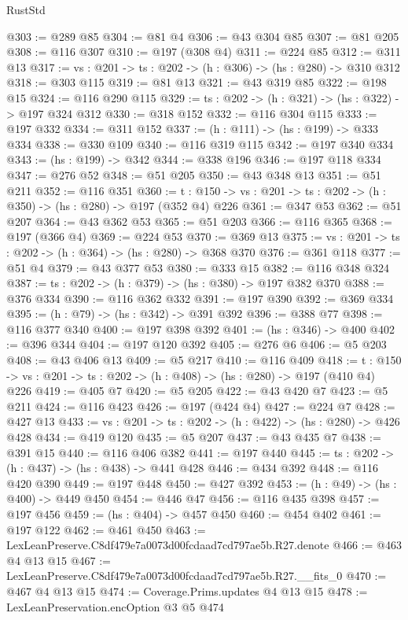 \begin{lexlean}{RustStd}
\begin{coremodule}
@303 := @289 @85
@304 := @81 @4
@306 := @43 @304 @85
@307 := @81 @205
@308 := @116 @307
@310 := @197 (@308 @4)
@311 := @224 @85
@312 := @311 @13
@317 := {vs : @201} -> {ts : @202} -> (h : @306) -> (hs : @280) -> @310 @312
@318 := @303 @115
@319 := @81 @13
@321 := @43 @319 @85
@322 := @198 @15
@324 := @116 @290 @115
@329 := {ts : @202} -> (h : @321) -> (hs : @322) -> @197 @324 @312
@330 := @318 @152
@332 := @116 @304 @115
@333 := @197 @332
@334 := @311 @152
@337 := (h : @111) -> (hs : @199) -> @333 @334
@338 := @330 @109
@340 := @116 @319 @115
@342 := @197 @340 @334
@343 := (hs : @199) -> @342
@344 := @338 @196
@346 := @197 @118 @334
@347 := @276 @52
@348 := @51 @205
@350 := @43 @348 @13
@351 := @51 @211
@352 := @116 @351
@360 := {t : @150} -> {vs : @201} -> {ts : @202} -> (h : @350) -> (hs : @280) -> @197 (@352 @4) @226
@361 := @347 @53
@362 := @51 @207
@364 := @43 @362 @53
@365 := @51 @203
@366 := @116 @365
@368 := @197 (@366 @4)
@369 := @224 @53
@370 := @369 @13
@375 := {vs : @201} -> {ts : @202} -> (h : @364) -> (hs : @280) -> @368 @370
@376 := @361 @118
@377 := @51 @4
@379 := @43 @377 @53
@380 := @333 @15
@382 := @116 @348 @324
@387 := {ts : @202} -> (h : @379) -> (hs : @380) -> @197 @382 @370
@388 := @376 @334
@390 := @116 @362 @332
@391 := @197 @390
@392 := @369 @334
@395 := (h : @79) -> (hs : @342) -> @391 @392
@396 := @388 @77
@398 := @116 @377 @340
@400 := @197 @398 @392
@401 := (hs : @346) -> @400
@402 := @396 @344
@404 := @197 @120 @392
@405 := @276 @6
@406 := @5 @203
@408 := @43 @406 @13
@409 := @5 @217
@410 := @116 @409
@418 := {t : @150} -> {vs : @201} -> {ts : @202} -> (h : @408) -> (hs : @280) -> @197 (@410 @4) @226
@419 := @405 @7
@420 := @5 @205
@422 := @43 @420 @7
@423 := @5 @211
@424 := @116 @423
@426 := @197 (@424 @4)
@427 := @224 @7
@428 := @427 @13
@433 := {vs : @201} -> {ts : @202} -> (h : @422) -> (hs : @280) -> @426 @428
@434 := @419 @120
@435 := @5 @207
@437 := @43 @435 @7
@438 := @391 @15
@440 := @116 @406 @382
@441 := @197 @440
@445 := {ts : @202} -> (h : @437) -> (hs : @438) -> @441 @428
@446 := @434 @392
@448 := @116 @420 @390
@449 := @197 @448
@450 := @427 @392
@453 := (h : @49) -> (hs : @400) -> @449 @450
@454 := @446 @47
@456 := @116 @435 @398
@457 := @197 @456
@459 := (hs : @404) -> @457 @450
@460 := @454 @402
@461 := @197 @122
@462 := @461 @450
@463 := LexLeanPreserve.C8df479e7a0073d00fcdaad7cd797ae5b.R27.denote
@466 := @463 @4 @13 @15
@467 := LexLeanPreserve.C8df479e7a0073d00fcdaad7cd797ae5b.R27.__fits_0
@470 := @467 @4 @13 @15
@474 := Coverage.Prims.updates @4 @13 @15
@478 := LexLeanPreservation.encOption @3 @5 @474

\end{coremodule}
\end{lexlean}

